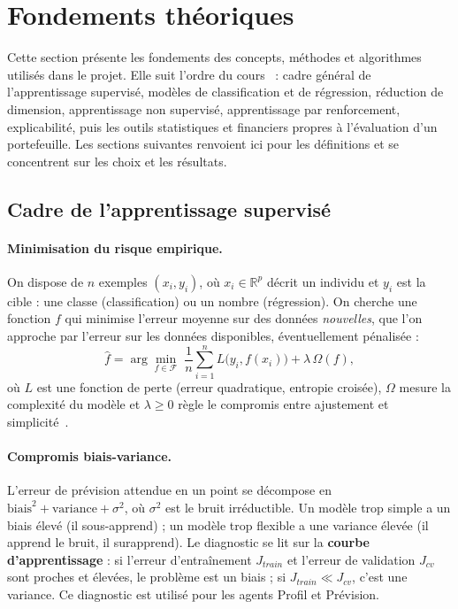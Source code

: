 \section{Fondements théoriques}
\label{sec:fondements}

Cette section présente les fondements des concepts, méthodes et algorithmes utilisés dans le projet. Elle suit l'ordre du cours~\cite{cours_ml} : cadre général de l'apprentissage supervisé, modèles de classification et de régression, réduction de dimension, apprentissage non supervisé, apprentissage par renforcement, explicabilité, puis les outils statistiques et financiers propres à l'évaluation d'un portefeuille. Les sections suivantes renvoient ici pour les définitions et se concentrent sur les choix et les résultats.

\subsection{Cadre de l'apprentissage supervisé}

\paragraph{Minimisation du risque empirique.} On dispose de $n$ exemples $(x_i, y_i)$, où $x_i \in \mathbb{R}^p$ décrit un individu et $y_i$ est la cible : une classe (classification) ou un nombre (régression). On cherche une fonction $f$ qui minimise l'erreur moyenne sur des données \emph{nouvelles}, que l'on approche par l'erreur sur les données disponibles, éventuellement pénalisée :
\begin{equation}
  \hat f = \arg\min_{f \in \mathcal{F}} \; \frac{1}{n}\sum_{i=1}^{n} L\big(y_i, f(x_i)\big) + \lambda\,\Omega(f),
\end{equation}
où $L$ est une fonction de perte (erreur quadratique, entropie croisée), $\Omega$ mesure la complexité du modèle et $\lambda \geq 0$ règle le compromis entre ajustement et simplicité~\cite{hastie2009}.

\paragraph{Compromis biais-variance.} L'erreur de prévision attendue en un point se décompose en $\text{biais}^2 + \text{variance} + \sigma^2$, où $\sigma^2$ est le bruit irréductible. Un modèle trop simple a un biais élevé (il sous-apprend) ; un modèle trop flexible a une variance élevée (il apprend le bruit, il surapprend). Le diagnostic se lit sur la \textbf{courbe d'apprentissage} : si l'erreur d'entraînement $J_{train}$ et l'erreur de validation $J_{cv}$ sont proches et élevées, le problème est un biais ; si $J_{train} \ll J_{cv}$, c'est une variance. Ce diagnostic est utilisé pour les agents Profil et Prévision.


